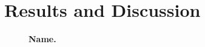 \chapter{Results and Discussion} \label{chap:3}

    \blindtext
    
    \begin{figure}[!hbt]
        \centering
        \caption[Name]{\textbf{Name.} \blindtext}
        \label{fig:2.1}
    \end{figure}